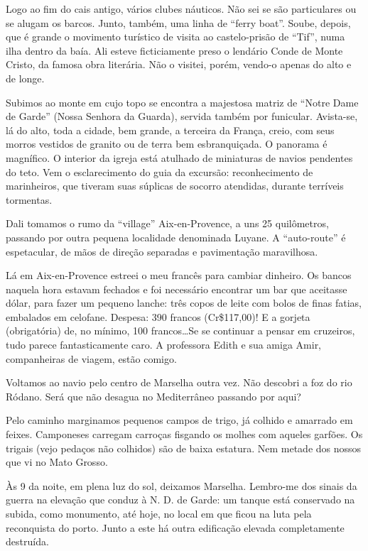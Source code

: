 Logo ao fim do cais antigo, vários clubes náuticos. Não sei se são particulares ou se alugam os barcos. Junto, também, uma linha de “ferry boat”. Soube, depois, que é grande o movimento turístico de visita ao castelo-prisão de “Tif”, numa ilha dentro da baía. Ali esteve ficticiamente preso o lendário Conde de Monte Cristo, da famosa obra literária. Não o visitei, porém, vendo-o apenas do alto e de longe.

Subimos ao monte em cujo topo se encontra a majestosa matriz de “Notre Dame de Garde” (Nossa Senhora da Guarda), servida também por funicular. Avista-se, lá do alto, toda a cidade, bem grande, a terceira da França, creio, com seus morros vestidos de granito ou de terra bem esbranquiçada. O panorama é magnífico. O interior da igreja está atulhado de miniaturas de navios pendentes do teto. Vem o esclarecimento do guia da excursão: reconhecimento de marinheiros, que tiveram suas súplicas de socorro atendidas, durante terríveis tormentas.

Dali tomamos o rumo da “village” Aix-en-Provence, a uns 25 quilômetros, passando por outra pequena localidade denominada Luyane. A “auto-route” é espetacular, de mãos de direção separadas e pavimentação maravilhosa.

Lá em Aix-en-Provence estreei o meu francês para cambiar dinheiro. Os bancos naquela hora estavam fechados e foi necessário encontrar um bar que aceitasse dólar, para fazer um pequeno lanche: três copos de leite com bolos de finas fatias, embalados em celofane. Despesa: 390 francos (Cr\$117,00)! E a gorjeta (obrigatória) de, no mínimo, 100 francos\ldots Se se continuar a pensar em cruzeiros, tudo parece fantasticamente caro. A professora Edith e sua amiga Amir, companheiras de viagem, estão comigo.

Voltamos ao navio pelo centro de Marselha outra vez. Não descobri a foz do rio Ródano. Será que não desagua no Mediterrâneo passando por aqui?

Pelo caminho marginamos pequenos campos de trigo, já colhido e amarrado em feixes. Camponeses carregam carroças fisgando os molhes com aqueles garfões. Os trigais (vejo pedaços não colhidos) são de baixa estatura. Nem metade dos nossos que vi no Mato Grosso.

Às 9 da noite, em plena luz do sol, deixamos Marselha. Lembro-me dos sinais da guerra na elevação que conduz à N. D. de Garde: um tanque está conservado na subida, como monumento, até hoje, no local em que ficou na luta pela reconquista do porto. Junto a este há outra edificação elevada completamente destruída.

